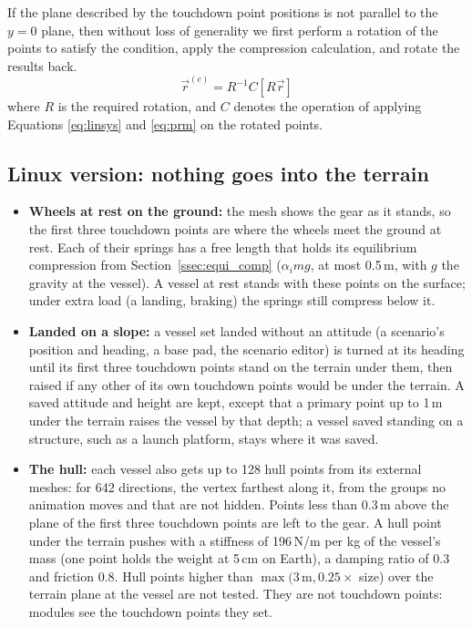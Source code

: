 \documentclass[Orbiter Technical Reference.tex]{subfiles}
\begin{document}
If the plane described by the touchdown point positions is not parallel to the $y=0$ plane, then without loss of generality we first perform a rotation of the points to satisfy the condition, apply the compression calculation, and rotate the results back.
\begin{equation}
\vec{r}^{(c)} = R^{-1} C [R \vec{r}]
\end{equation}
where $R$ is the required rotation, and $C$ denotes the operation of applying Equations \ref{eq:linsys} and \ref{eq:prm} on the rotated points.

\subsection{Linux version: nothing goes into the terrain}\label{ssec:terrain_contact}
\begin{itemize}
\item \textbf{Wheels at rest on the ground:} the mesh shows the gear as it stands, so the first three touchdown points are where the wheels meet the ground at rest. Each of their springs has a free length that holds its equilibrium compression from Section~\ref{ssec:equi_comp} ($\alpha_i m g$, at most 0.5\,m, with $g$ the gravity at the vessel). A vessel at rest stands with these points on the surface; under extra load (a landing, braking) the springs still compress below it.
\item \textbf{Landed on a slope:} a vessel set landed without an attitude (a scenario's position and heading, a base pad, the scenario editor) is turned at its heading until its first three touchdown points stand on the terrain under them, then raised if any other of its own touchdown points would be under the terrain. A saved attitude and height are kept, except that a primary point up to 1\,m under the terrain raises the vessel by that depth; a vessel saved standing on a structure, such as a launch platform, stays where it was saved.
\item \textbf{The hull:} each vessel also gets up to 128 hull points from its external meshes: for 642 directions, the vertex farthest along it, from the groups no animation moves and that are not hidden. Points less than 0.3\,m above the plane of the first three touchdown points are left to the gear. A hull point under the terrain pushes with a stiffness of 196\,N/m per kg of the vessel's mass (one point holds the weight at 5\,cm on Earth), a damping ratio of 0.3 and friction 0.8. Hull points higher than $\max(3\,\mathrm{m}, 0.25 \times$ size) over the terrain plane at the vessel are not tested. They are not touchdown points: modules see the touchdown points they set.

\end{itemize}
\end{document}
